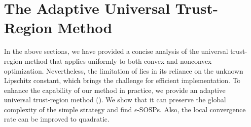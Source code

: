 \section{The Adaptive Universal Trust-Region Method}\label{sec.adaptive}
In the above sections, we have provided a concise analysis of the universal trust-region method that applies uniformly to both convex and nonconvex optimization. Nevertheless, the limitation of  lies in its reliance on the unknown Lipschitz constant, which brings the challenge for efficient implementation. To enhance the capability of our method in practice, we provide an adaptive universal trust-region method (). We show that it can preserve the global complexity of the simple strategy and find $\epsilon$-SOSPs. Also, the local convergence rate can be improved to quadratic.


